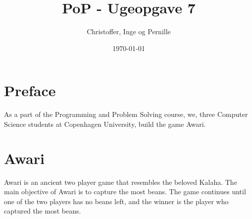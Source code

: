\documentclass[a4paper]{report}
\title{PoP - Ugeopgave 7}
\author{Christoffer, Inge og Pernille}
\date{\today}
\begin{document}
\maketitle

\section{Preface}
As a part of the Programming and Problem Solving course, we, 
three Computer Science students at Copenhagen University, build the game Awari.

\section{Awari}
Awari is an ancient two player game that resembles the beloved Kalaha. The main objective of
Awari is to capture the most beans. The game continues until one of the two players
has no beans left, and the winner is the player who captured the most beans.

\lstset{language=FSharp}

\end{document}

